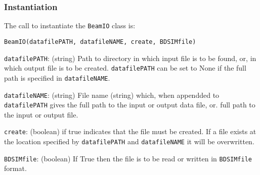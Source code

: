 \subsubsection{Instantiation}
\noindent
The call to instantiate the \texttt{BeamIO} class is:
\begin{center}
  \texttt{BeamIO(datafilePATH, datafileNAME, create, BDSIMfile)}
\end{center}
\begin{description}
  \item{\texttt{datafilePATH}}: (string) Path to directory in which
    input file is to be found, or, in which output file is to be
    created. 
    \texttt{datafilePATH} can be set to  None if the full path is
    specified in \texttt{datafileNAME}.
  \item{\texttt{datafileNAME}}: (string) File name (string) which,
    when appendded to \texttt{datafilePATH} gives the full path to the
    input or output data file, or. full path to the input or output
    file.
  \item{\texttt{create}}: (boolean) if true indicates that the file
    must be created.
    If a file exists at the location specified
    by \texttt{datafilePATH} and \texttt{datafileNAME} it will be
    overwritten.
  \item{\texttt{BDSIMfile}}: (boolean) If True then the file is to be
    read or written in \texttt{BDSIMfile} format.
\end{description}

